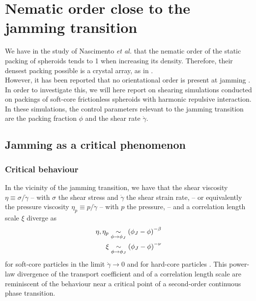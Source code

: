 \documentclass[class=article, float=false, crop=false]{standalone}
\begin{document}
\section{Nematic order close to the jamming transition}
\label{sec:jamming}

We have in the study of Nascimento \textit{et al.} \cite{nascimento2017density} that the nematic order of the static packing of spheroids tends to 1 when increasing its density. Therefore, their densest packing possible is a crystal array, as in \cite{donev2004unusually}.\\

However, it has been reported that no orientational order is present at jamming \cite{donev2004improving,PRL94.198001}. In order to investigate this, we will here report on shearing simulations conducted on packings of soft-core frictionless spheroids with harmonic repulsive interaction. In these simulations, the control parameters relevant to the jamming transition are the packing fraction $\phi$ and the shear rate $\dot{\gamma}$.

\subsection{Jamming as a critical phenomenon}

\subsubsection{Critical behaviour}

In the vicinity of the jamming transition, we have that the shear viscosity $\eta \equiv \sigma/\dot{\gamma}$ -- with $\sigma$ the shear stress and $\dot{\gamma}$ the shear strain rate, -- or equivalently the pressure viscosity $\eta_p \equiv p/\dot{\gamma}$ -- with $p$ the pressure, -- and a correlation length scale $\xi$ diverge as
\begin{equation}
\begin{aligned}
\eta,\eta_p \underset{\phi\rightarrow\phi_J}{\sim} \left(\phi_J - \phi\right)^{-\beta}\\
\xi \underset{\phi\rightarrow\phi_J}{\sim} \left(\phi_J - \phi\right)^{-\nu}
\end{aligned}
\label{critical_exponents}
\end{equation}
for soft-core particles in the limit $\dot{\gamma}\rightarrow0$ \cite{PRL99.178001,PRE83.030302} and for hard-core particles \cite{PRL109.108001}. This power-law divergence of the transport coefficient and of a correlation length scale are reminiscent of the behaviour near a critical point \cite{PRE83.030302,plischke1994equilibrium,PRE83.030303} of a second-order continuous phase transition.
\end{document}
